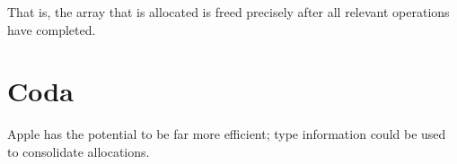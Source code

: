 \documentclass{article}
\begin{document}
That is, the array that is allocated is freed precisely after all relevant operations have completed.

\section{Coda}

Apple has the potential to be far more efficient; type information could be used to consolidate allocations.
\end{document}
